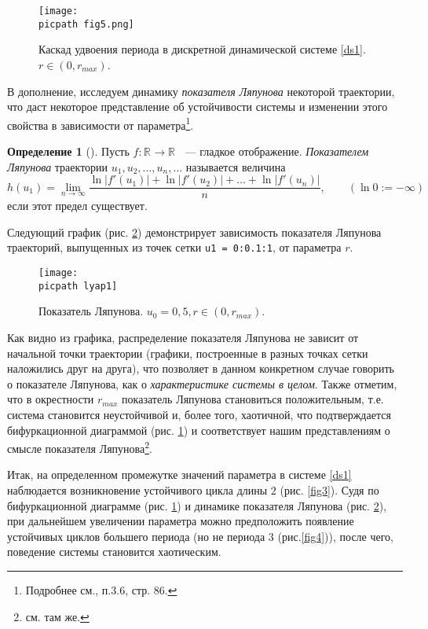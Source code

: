 \documentclass[oneside,final,12pt]{article}
\newcommand*\Rn  [1]{\mathbb{R}^{#1}}
\newcommand*\abs[1]{|#1|}
\newcommand*\inter[2]{(#1,#2)}
\newcommand*\picsize{0.5\textwidth}
\newcommand*\picpath{pictures/}
\theoremstyle{plain}
\theoremstyle{remark}
\theoremstyle{definition}
\newtheorem{definition}{Определение}
\theoremstyle{plain}
\begin{document}
	\begin{figure}[!h]
			\centering
			\texttt{[image: \\picpath fig5.png]}
			\caption{Каскад удвоения периода в дискретной динамической системе \eqref{ds1}. \(r \in \inter{0}{r_{max}}\).} \label{fig5}
	\end{figure}

	В дополнение, исследуем динамику \emph{показателя Ляпунова} некоторой траектории, что даст некоторое представление об устойчивости системы и изменении этого свойства в зависимости от параметра\footnote{Подробнее см.\cite{DSMB}, п.3.6, стр. 86.}.
	\begin{definition}[\cite{DSMB}]
		Пусть \(f:\Rn{} \rightarrow \Rn{}\) ~--- гладкое отображение. \emph{Показателем Ляпунова} траектории \(u_1,u_2,\ldots,u_n,\ldots\) называется величина
		\[h(u_1) = \lim_{n\rightarrow\infty} \frac{\ln\abs{f'(u_1)} + \ln\abs{f'(u_2)} + \ldots + \ln\abs{f'(u_n)}}{n}, \qquad (\ln0 := -\infty)\]
если этот предел существует.
	\end{definition}

	Следующий график (рис. \ref{lyap1}) демонстрирует зависимость показателя Ляпунова траекторий, выпущенных из точек сетки \texttt{u1 = 0:0.1:1}, от параметра \(r\).

	\begin{figure}[!h]
			\centering
			\texttt{[image: \\picpath lyap1]}
			\caption{Показатель Ляпунова. \(u_0 = 0,5, r \in \inter{0}{r_{max}}\).} \label{lyap1}
	\end{figure}
Как видно из графика, распределение показателя Ляпунова не зависит от начальной точки траектории (графики, построенные в разных точках сетки наложились друг на друга), что позволяет в данном конкретном случае говорить о показателе Ляпунова, как о \emph{характеристике системы в целом}. Также отметим, что в окрестности \(r_{max}\) показатель Ляпунова становиться положительным, т.е. система становится неустойчивой и, более того, хаотичной, что подтверждается бифуркационной диаграммой (рис. \ref{fig5}) и соответствует нашим представлениям о смысле показателя Ляпунова\footnote{см. там же.}.

	Итак, на определенном промежутке значений параметра в системе \eqref{ds1} наблюдается возникновение устойчивого цикла длины \(2\) (рис. \ref{fig3}). Судя по бифуркационной диаграмме (рис. \ref{fig5}) и динамике показателя Ляпунова (рис. \ref{lyap1}), при дальнейшем увеличении параметра можно предположить появление устойчивых циклов большего периода (но не периода \(3\) (рис.\ref{fig4})), после чего, поведение системы становится хаотическим. 
\end{document}
